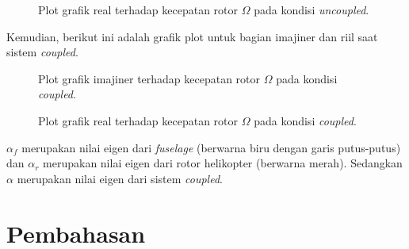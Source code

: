 \begin{figure}[H]
	\centering
	\caption{Plot grafik real terhadap kecepatan rotor $\Omega$ pada kondisi \textit{uncoupled}.}
	\label{fig:real(uncoupled)}
\end{figure}

Kemudian, berikut ini adalah grafik plot untuk bagian imajiner dan riil saat sistem \textit{coupled}.

\begin{figure}[H]
	\centering
	\caption{Plot grafik imajiner terhadap kecepatan rotor $\Omega$ pada kondisi \textit{coupled}.}
	\label{fig:imag(coupled)}
\end{figure}

\begin{figure}[H]
	\centering
	\caption{Plot grafik real terhadap kecepatan rotor $\Omega$ pada kondisi \textit{coupled}.}
	\label{fig:real(coupled)}
\end{figure}

$\alpha_f$ merupakan nilai eigen dari \textit{fuselage} (berwarna biru dengan garis putus-putus) dan $\alpha_r$ merupakan nilai eigen dari rotor helikopter (berwarna merah). Sedangkan $\alpha$ merupakan nilai eigen dari sistem \textit{coupled}.

\section{Pembahasan}
\label{sec:pembahasan}
